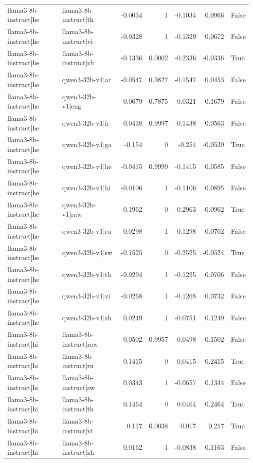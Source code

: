 \begin{table}
\begin{tabular}{l l r r r r l}
llama3-8b-instruct|he & llama3-8b-instruct|th & -0.0034 & 1 & -0.1034 & 0.0966 & False \\
llama3-8b-instruct|he & llama3-8b-instruct|vi & -0.0328 & 1 & -0.1329 & 0.0672 & False \\
llama3-8b-instruct|he & llama3-8b-instruct|zh & -0.1336 & 0.0002 & -0.2336 & -0.0336 & True \\
llama3-8b-instruct|he & qwen3-32b-v1|ar & -0.0547 & 0.9827 & -0.1547 & 0.0453 & False \\
llama3-8b-instruct|he & qwen3-32b-v1|eng & 0.0679 & 0.7875 & -0.0321 & 0.1679 & False \\
llama3-8b-instruct|he & qwen3-32b-v1|fr & -0.0438 & 0.9997 & -0.1438 & 0.0563 & False \\
llama3-8b-instruct|he & qwen3-32b-v1|ga & -0.154 & 0 & -0.254 & -0.0539 & True \\
llama3-8b-instruct|he & qwen3-32b-v1|he & -0.0415 & 0.9999 & -0.1415 & 0.0585 & False \\
llama3-8b-instruct|he & qwen3-32b-v1|hi & -0.0106 & 1 & -0.1106 & 0.0895 & False \\
llama3-8b-instruct|he & qwen3-32b-v1|raw & -0.1962 & 0 & -0.2963 & -0.0962 & True \\
llama3-8b-instruct|he & qwen3-32b-v1|ru & -0.0298 & 1 & -0.1298 & 0.0702 & False \\
llama3-8b-instruct|he & qwen3-32b-v1|sw & -0.1525 & 0 & -0.2525 & -0.0524 & True \\
llama3-8b-instruct|he & qwen3-32b-v1|th & -0.0294 & 1 & -0.1295 & 0.0706 & False \\
llama3-8b-instruct|he & qwen3-32b-v1|vi & -0.0268 & 1 & -0.1268 & 0.0732 & False \\
llama3-8b-instruct|he & qwen3-32b-v1|zh & 0.0249 & 1 & -0.0751 & 0.1249 & False \\
llama3-8b-instruct|hi & llama3-8b-instruct|raw & 0.0502 & 0.9957 & -0.0498 & 0.1502 & False \\
llama3-8b-instruct|hi & llama3-8b-instruct|ru & 0.1415 & 0 & 0.0415 & 0.2415 & True \\
llama3-8b-instruct|hi & llama3-8b-instruct|sw & 0.0343 & 1 & -0.0657 & 0.1344 & False \\
llama3-8b-instruct|hi & llama3-8b-instruct|th & 0.1464 & 0 & 0.0464 & 0.2464 & True \\
llama3-8b-instruct|hi & llama3-8b-instruct|vi & 0.117 & 0.0038 & 0.017 & 0.217 & True \\
llama3-8b-instruct|hi & llama3-8b-instruct|zh & 0.0162 & 1 & -0.0838 & 0.1163 & False \\

\end{tabular}
\end{table}
